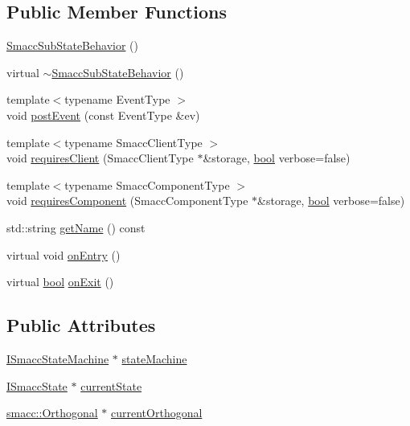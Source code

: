 \subsection*{Public Member Functions}
\begin{DoxyCompactItemize}
\item 
\hyperlink{classsmacc_1_1SmaccSubStateBehavior_abc902f4fa003071f759a2255b276fb90}{Smacc\+Sub\+State\+Behavior} ()
\item 
virtual \hyperlink{classsmacc_1_1SmaccSubStateBehavior_a69c91bee534322bc09423d6f5b0c33a2}{$\sim$\+Smacc\+Sub\+State\+Behavior} ()
\item 
{\footnotesize template$<$typename Event\+Type $>$ }\\void \hyperlink{classsmacc_1_1SmaccSubStateBehavior_a8538664f9828247727a27446112788a2}{post\+Event} (const Event\+Type \&ev)
\item 
{\footnotesize template$<$typename Smacc\+Client\+Type $>$ }\\void \hyperlink{classsmacc_1_1SmaccSubStateBehavior_ae8361a9e794b02f9f3d962b881e4fd7d}{requires\+Client} (Smacc\+Client\+Type $\ast$\&storage, \hyperlink{classbool}{bool} verbose=false)
\item 
{\footnotesize template$<$typename Smacc\+Component\+Type $>$ }\\void \hyperlink{classsmacc_1_1SmaccSubStateBehavior_a9f31f62f886cc06017e92fa0d834b12d}{requires\+Component} (Smacc\+Component\+Type $\ast$\&storage, \hyperlink{classbool}{bool} verbose=false)
\item 
std\+::string \hyperlink{classsmacc_1_1SmaccSubStateBehavior_a077a9784d17e3a95284ad351a43cfcbb}{get\+Name} () const 
\item 
virtual void \hyperlink{classsmacc_1_1SmaccSubStateBehavior_a7c28e1c46238bbb2c2e0450573c6de94}{on\+Entry} ()
\item 
virtual \hyperlink{classbool}{bool} \hyperlink{classsmacc_1_1SmaccSubStateBehavior_ab78b9de76c04a7ab6c16d5924e216ef9}{on\+Exit} ()
\end{DoxyCompactItemize}
\subsection*{Public Attributes}
\begin{DoxyCompactItemize}
\item 
\hyperlink{classsmacc_1_1ISmaccStateMachine}{I\+Smacc\+State\+Machine} $\ast$ \hyperlink{classsmacc_1_1SmaccSubStateBehavior_ae3ff8a316bdd4bc5b7fee59d19464609}{state\+Machine}
\item 
\hyperlink{classsmacc_1_1ISmaccState}{I\+Smacc\+State} $\ast$ \hyperlink{classsmacc_1_1SmaccSubStateBehavior_a62e2b9da4a446f09396d0b4c01659b88}{current\+State}
\item 
\hyperlink{classsmacc_1_1Orthogonal}{smacc\+::\+Orthogonal} $\ast$ \hyperlink{classsmacc_1_1SmaccSubStateBehavior_a40aac919bb306d95838fdfcc34cfe391}{current\+Orthogonal}
\end{DoxyCompactItemize}


